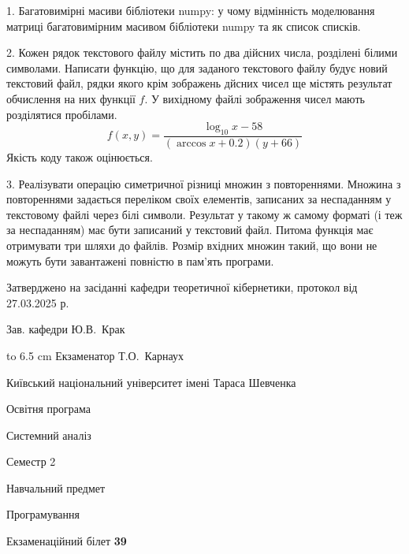 \documentclass[12pt, ukrainian]{article}
\begin{document}
{%
1. Багатовимірні масиви бібліотеки numpy: у чому відмінність моделювання матриці багатовимірним масивом бібліотеки numpy та як список списків.%
\par
\vspace{2mm}

2. Кожен рядок текстового файлу містить по два дійсних числа, розділені білими символами.
Написати функцію, що для заданого текстового файлу будує новий текстовий файл, рядки якого крім зображень дйсних чисел ще містять результат обчислення на них функції $f$. У вихідному файлі зображення чисел мають розділятися пробілами. 
$$f(x, y) =\frac{\log_{10} x - 58}{(\arccos x + 0.2) (y + 66)}$$ 
Якість коду також оцінюється.

\par
\vspace{2mm}

3. Реалізувати операцію симетричної різниці множин з повтореннями. Множина з повтореннями задається переліком своїх елементів, записаних за неспаданням у текстовому файлі через білі символи. Результат у такому ж самому форматі (і теж за неспаданням) має бути записаний у текстовий файл. Питома функція має отримувати три шляхи до файлів. Розмір вхідних множин такий, що вони не можуть бути завантажені повністю в пам’ять програми.

}
{\smallskip\smallskip \begin {scriptsize} Затверджено на засіданні кафедри теоретичної кібернетики, протокол   від   27.03.2025 р.\par\smallskip\smallskip\smallskip\smallskip
{\parbox {6.5 cm} {Зав. кафедри \dotfill Ю.В.~Крак}}\hspace {0.7cm} {\hbox to 6.5 cm { Екзаменатор \dotfill Т.О.~Карнаух}} \end{scriptsize}}
\newpage
{{\begin {scriptsize}\par
{ \center  Київський національний університет імені Тараса Шевченка \par}
{\parbox {5 cm}{Освітня програма \hfill}{\parbox {7 cm}{Системний аналіз\hfill}}\parbox {6 cm}{\hfill Семестр 2}}\par
{\parbox {5 cm} {Навчальний предмет \hfill}\parbox {7 cm}{Програмування \hfill}\parbox {6cm}{\hfill}\par}\vspace{-15pt} \end{scriptsize}}{\center Екзаменаційний білет \No \textbf { 39 }\par}}
\end{document}
